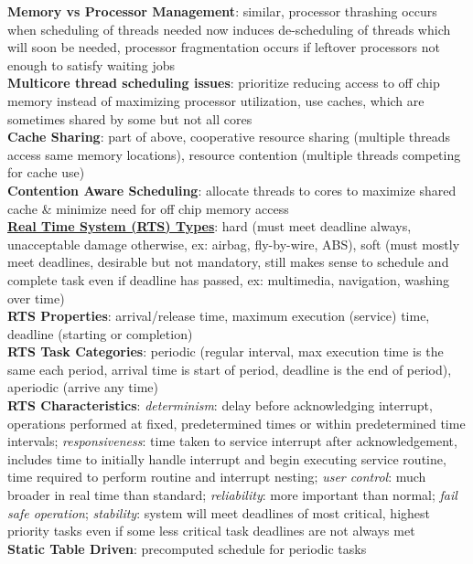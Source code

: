 \documentclass[a4paper]{article}
\begin{document}
\begin{multicols}{2}
        \textbf{Memory vs Processor Management}: similar, processor thrashing occurs when scheduling of threads needed now induces de-scheduling of threads which will soon be needed, processor fragmentation occurs if leftover processors not enough to satisfy waiting jobs\\
        \textbf{Multicore thread scheduling issues}: prioritize reducing access to off chip memory instead of maximizing processor utilization, use caches, which are sometimes shared by some but not all cores\\
        \textbf{Cache Sharing}: part of above, cooperative resource sharing (multiple threads access same memory locations), resource contention (multiple threads competing for cache use)\\
        \textbf{Contention Aware Scheduling}: allocate threads to cores to maximize shared cache \& minimize need for off chip memory access\\
        \underline{\textbf{Real Time System  (RTS) Types}}: hard (must meet deadline always, unacceptable damage otherwise, ex: airbag, fly-by-wire, ABS), soft (must mostly meet deadlines, desirable but not mandatory, still makes sense to schedule and complete task even if deadline has passed, ex: multimedia, navigation, washing over time)\\
        \textbf{RTS Properties}: arrival/release time, maximum execution (service) time, deadline (starting or completion)\\
        \textbf{RTS Task Categories}: periodic (regular interval, max execution time is the same each period, arrival time is start of period, deadline is the end of period), aperiodic (arrive any time)\\
        \textbf{RTS Characteristics}:
        \textit{determinism}: delay before acknowledging interrupt, operations performed at fixed, predetermined times or within predetermined time intervals;
        \textit{responsiveness}: time taken to service interrupt after acknowledgement, includes time to initially handle interrupt and begin executing service routine, time required to perform routine and interrupt nesting;
        \textit{user control}: much broader in real time than standard;
        \textit{reliability}: more important than normal;
        \textit{fail safe operation};
        \textit{stability}: system will meet deadlines of most critical, highest priority tasks even if some less critical task deadlines are not always met\\
        \textbf{Static Table Driven}: precomputed schedule for periodic tasks\\

\end{multicols}
\end{document}
